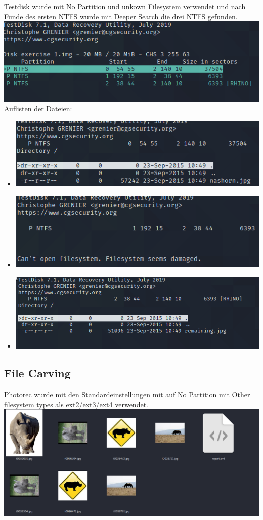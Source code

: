 Testdisk wurde mit No Partition und unkown Filesystem verwendet und nach Funde des ersten NTFS wurde mit Deeper Search die drei NTFS gefunden.\\
\includegraphics[scale=0.6]{bilder/3_Ntfs_Testdisk.png } \\
Auflisten der Dateien:
\begin{itemize}
\item \includegraphics[scale=0.6]{bilder/first_Ntfs.png } 
\item \includegraphics[scale=0.6]{bilder/second_Ntfs.png } 
\item \includegraphics[scale=0.6]{bilder/third_Ntfs.png } 
\end{itemize}

\subsection{File Carving}
Photorec wurde mit den Standardeinstellungen mit auf No Partition mit Other filesystem types als ext2/ext3/ext4  verwendet.\\
\includegraphics[scale=0.25]{bilder/photorec.png }
